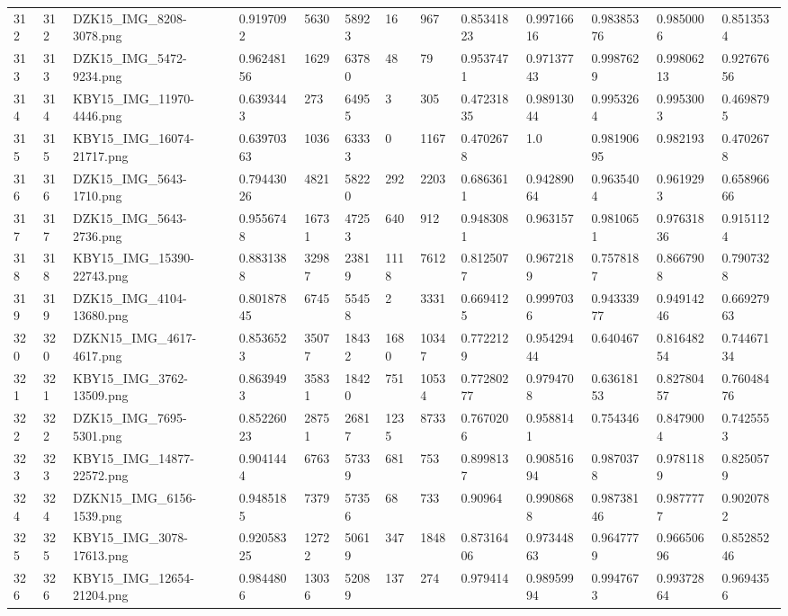 \documentclass[11pt, a4paper, twoside]{report}
\begin{document}
\begin{longtable}[c]{@{}lllllllllllll@{}}
312 & 312 & DZK15\_IMG\_8208-3078.png & 0.9197092 & 5630 & 58923 & 16 & 967 & 0.85341823 & 0.99716616 & 0.98385376 & 0.9850006 & 0.8513534 \\
313 & 313 & DZK15\_IMG\_5472-9234.png & 0.96248156 & 1629 & 63780 & 48 & 79 & 0.9537471 & 0.97137743 & 0.9987629 & 0.99806213 & 0.92767656 \\
314 & 314 & KBY15\_IMG\_11970-4446.png & 0.6393443 & 273 & 64955 & 3 & 305 & 0.47231835 & 0.98913044 & 0.9953264 & 0.9953003 & 0.4698795 \\
315 & 315 & KBY15\_IMG\_16074-21717.png & 0.63970363 & 1036 & 63333 & 0 & 1167 & 0.4702678 & 1.0 & 0.98190695 & 0.982193 & 0.4702678 \\
316 & 316 & DZK15\_IMG\_5643-1710.png & 0.79443026 & 4821 & 58220 & 292 & 2203 & 0.6863611 & 0.94289064 & 0.9635404 & 0.9619293 & 0.65896666 \\
317 & 317 & DZK15\_IMG\_5643-2736.png & 0.9556748 & 16731 & 47253 & 640 & 912 & 0.9483081 & 0.963157 & 0.9810651 & 0.97631836 & 0.9151124 \\
318 & 318 & KBY15\_IMG\_15390-22743.png & 0.8831388 & 32987 & 23819 & 1118 & 7612 & 0.8125077 & 0.9672189 & 0.7578187 & 0.8667908 & 0.7907328 \\
319 & 319 & DZK15\_IMG\_4104-13680.png & 0.80187845 & 6745 & 55458 & 2 & 3331 & 0.6694125 & 0.9997036 & 0.94333977 & 0.94914246 & 0.66927963 \\
320 & 320 & DZKN15\_IMG\_4617-4617.png & 0.8536523 & 35077 & 18432 & 1680 & 10347 & 0.7722129 & 0.95429444 & 0.640467 & 0.81648254 & 0.74467134 \\
321 & 321 & KBY15\_IMG\_3762-13509.png & 0.8639493 & 35831 & 18420 & 751 & 10534 & 0.77280277 & 0.9794708 & 0.63618153 & 0.82780457 & 0.76048476 \\
322 & 322 & DZK15\_IMG\_7695-5301.png & 0.85226023 & 28751 & 26817 & 1235 & 8733 & 0.7670206 & 0.9588141 & 0.754346 & 0.8479004 & 0.7425553 \\
323 & 323 & KBY15\_IMG\_14877-22572.png & 0.9041444 & 6763 & 57339 & 681 & 753 & 0.8998137 & 0.90851694 & 0.9870378 & 0.9781189 & 0.8250579 \\
324 & 324 & DZKN15\_IMG\_6156-1539.png & 0.9485185 & 7379 & 57356 & 68 & 733 & 0.90964 & 0.9908688 & 0.98738146 & 0.9877777 & 0.9020782 \\
325 & 325 & KBY15\_IMG\_3078-17613.png & 0.92058325 & 12722 & 50619 & 347 & 1848 & 0.87316406 & 0.97344863 & 0.9647779 & 0.96650696 & 0.85285246 \\
326 & 326 & KBY15\_IMG\_12654-21204.png & 0.9844806 & 13036 & 52089 & 137 & 274 & 0.979414 & 0.98959994 & 0.9947673 & 0.99372864 & 0.9694356 \\

\end{longtable}
\end{document}
